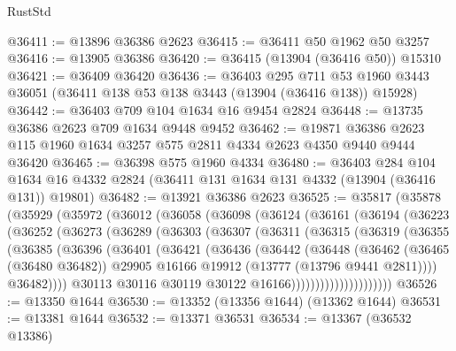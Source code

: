 \begin{lexlean}{RustStd}
\begin{coremodule}
@36411 := @13896 @36386 @2623
@36415 := @36411 @50 @1962 @50 @3257
@36416 := @13905 @36386
@36420 := @36415 (@13904 (@36416 @50)) @15310
@36421 := @36409 @36420
@36436 := @36403
    @295
    @711
    @53
    @1960
    @3443
    @36051
    (@36411 @138 @53 @138 @3443 (@13904 (@36416 @138)) @15928)
@36442 := @36403 @709 @104 @1634 @16 @9454 @2824
@36448 := @13735 @36386 @2623 @709 @1634 @9448 @9452
@36462 := @19871 @36386 @2623 @115 @1960 @1634 @3257 @575 @2811 @4334 @2623 @4350 @9440 @9444 @36420
@36465 := @36398 @575 @1960 @4334
@36480 := @36403
    @284
    @104
    @1634
    @16
    @4332
    @2824
    (@36411 @131 @1634 @131 @4332 (@13904 (@36416 @131)) @19801)
@36482 := @13921 @36386 @2623
@36525 := @35817
    (@35878
      (@35929
        (@35972
          (@36012
            (@36058
              (@36098
                (@36124
                  (@36161
                    (@36194
                      (@36223
                        (@36252
                          (@36273
                            (@36289
                              (@36303
                                (@36307
                                  (@36311
                                    (@36315
                                      (@36319
                                        (@36355
                                          (@36385
                                            (@36396
                                              (@36401
                                                (@36421
                                                  (@36436
                                                    (@36442
                                                      (@36448
                                                        (@36462
                                                          (@36465 (@36480 @36482))
                                                          @29905
                                                          @16166
                                                          @19912
                                                          (@13777 (@13796 @9441 @2811))))
                                                      @36482))))
                                              @30113
                                              @30116
                                              @30119
                                              @30122
                                              @16166)))))))))))))))))))))
@36526 := @13350 @1644
@36530 := @13352 (@13356 @1644) (@13362 @1644)
@36531 := @13381 @1644
@36532 := @13371 @36531
@36534 := @13367 (@36532 @13386)

\end{coremodule}
\end{lexlean}
